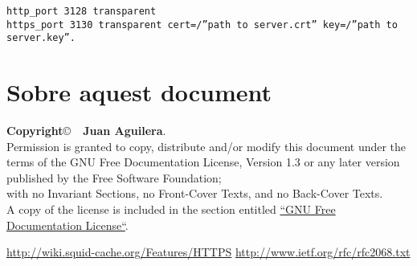 \documentclass[a4paper]{article}
\begin{document}
\begin{verbatim}
http_port 3128 transparent 
https_port 3130 transparent cert=/”path to server.crt” key=/”path to server.key”. 
\end{verbatim}

\section{Sobre aquest document}
\textbf{Copyright}\copyright\ \textbf{\the\year\ Juan Aguilera}.\\
Permission is granted to copy, distribute and/or modify this document under the terms of the GNU Free Documentation License, Version 1.3 or any later version published by the Free Software Foundation;\\
with no Invariant Sections, no Front-Cover Texts, and no Back-Cover Texts.\\
A copy of the license is included in the section entitled \href{http://www.gnu.org/licenses/fdl.html}{``GNU Free Documentation License``}.

\begin{thebibliography}{99}
	 \url{http://wiki.squid-cache.org/Features/HTTPS}
	 \url{http://www.ietf.org/rfc/rfc2068.txt}
\end{thebibliography}
\end{document}

